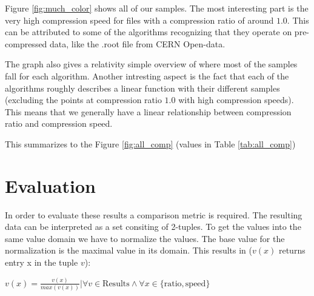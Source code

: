 \documentclass[
	12pt,
	a4paper,
	BCOR10mm,
	DIV14,
	listof=totoc,
	bibliography=totoc,
	headsepline
]{scrreprt}
\begin{document}

Figure \ref{fig:much_color} shows all of our samples. The most interesting part is the very high compression speed for files with a compression ratio of around $1.0$. This can be attributed to some of the algorithms recognizing that they operate on pre-compressed data, like the .root file from CERN Open-data.

The graph also gives a relativity simple overview of where most of the samples fall for each algorithm.
Another intresting aspect is the fact that each of the algorithms roughly describes a linear function with their different samples (excluding the points at compression ratio $1.0$ with high compression speeds).
This means that we generally have a linear relationship between compression ratio and compression speed.
\FloatBarrier








\FloatBarrier


This summarizes to the Figure \ref{fig:all_comp} (values in Table \ref{tab:all_comp})

\FloatBarrier

\section{Evaluation}
In order to evaluate these results a comparison metric is required.
The resulting data can be interpreted as a set consiting of 2-tuples.
To get the values into the same value domain we have to normalize the values.
The base value for the normalization is the maximal value in its domain.
This results in (\(v(x)\) returns entry x in the tuple \(v\)):
\begin{center}
	\(
	   v(x) = \frac{v(x)}{max(v(x))}|\forall v \in \text{Results} \land \forall x \in \{\text{ratio}, \text{speed}\}
	\)
\end{center}
\end{document}
